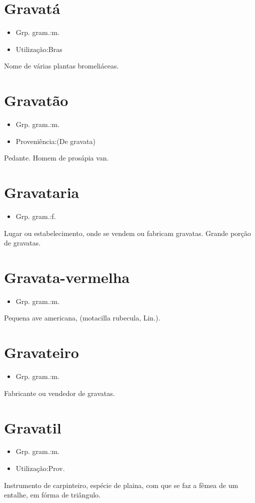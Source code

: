 \section{Gravatá}
\begin{itemize}
\item {Grp. gram.:m.}
\end{itemize}
\begin{itemize}
\item {Utilização:Bras}
\end{itemize}
Nome de várias plantas bromeliáceas.
\section{Gravatão}
\begin{itemize}
\item {Grp. gram.:m.}
\end{itemize}
\begin{itemize}
\item {Proveniência:(De \textunderscore gravata\textunderscore )}
\end{itemize}
Pedante.
Homem de prosápia van.
\section{Gravataria}
\begin{itemize}
\item {Grp. gram.:f.}
\end{itemize}
Lugar ou estabelecimento, onde se vendem ou fabricam gravatas.
Grande porção de gravatas.
\section{Gravata-vermelha}
\begin{itemize}
\item {Grp. gram.:m.}
\end{itemize}
Pequena ave americana, (\textunderscore motacilla rubecula\textunderscore , Lin.).
\section{Gravateiro}
\begin{itemize}
\item {Grp. gram.:m.}
\end{itemize}
Fabricante ou vendedor de gravatas.
\section{Gravatil}
\begin{itemize}
\item {Grp. gram.:m.}
\end{itemize}
\begin{itemize}
\item {Utilização:Prov.}
\end{itemize}
Instrumento de carpinteiro, espécie de plaina, com que se faz a fêmea de um entalhe, em fórma de triângulo.
